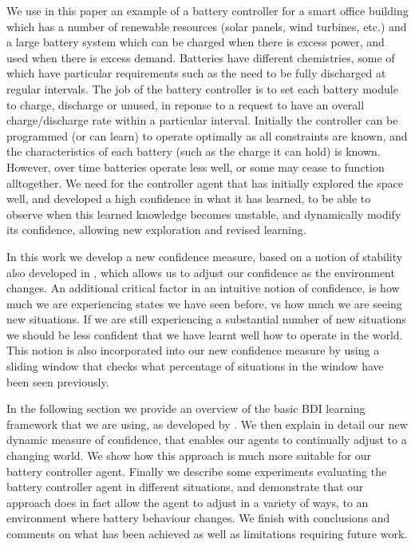We use in this paper an example of a battery controller for a smart
office building which has a number of renewable resources (solar
panels, wind turbines, etc.) and a large battery system which can be
charged when there is excess power, and used when there is excess
demand. Batteries have different chemistries, some of which have
particular requirements such as the need to be fully discharged at
regular intervals. The job of the battery controller is to set each
battery module to charge, discharge or unused, in reponse to a request to
have an overall charge/discharge rate within a particular interval.
Initially the controller can be programmed (or can learn) to operate
optimally as all constraints are known, and the characteristics of
each battery (such as the charge it can hold) is known. However, over
time batteries operate less well, or some may cease to function
alltogether. We need for the controller agent that has initially
explored the space well, and developed a high confidence in what it
has learned, to be able to observe when this learned knowledge becomes
unstable, and dynamically modify its confidence, allowing new
exploration and revised learning.

In this work we develop a new confidence measure, based on a notion of
stability also developed in 
\cite{airiau09:enhancing,singh10:learning}, which allows us to adjust our
confidence as the environment changes.  An additional critical factor in
an intuitive notion of confidence, is how much we are experiencing
states we have seen before, vs how much we are seeing new
situations. If we are still experiencing a substantial number of new
situations we should be less confident that we have learnt well how to
operate in the world. This notion is also incorporated into our new
confidence measure by using a sliding window that checks what
percentage of situations in the window have been seen previously.

In the following section we provide an overview of the basic BDI
learning framework that we are using, as developed by 
\cite{airiau09:enhancing,singh10:extending,singh10:learning}. We then
explain in detail our new dynamic measure of confidence, that enables
our agents to continually adjust to a changing world. We show how this
approach is much more suitable for our battery controller
agent. Finally we describe some experiments evaluating the battery
controller agent in different situations, and demonstrate that our
approach does in fact allow the agent to adjust in a variety of ways,
to an environment where battery behaviour changes. We finish with
conclusions and comments on what has been achieved as well as
limitations requiring future work.
